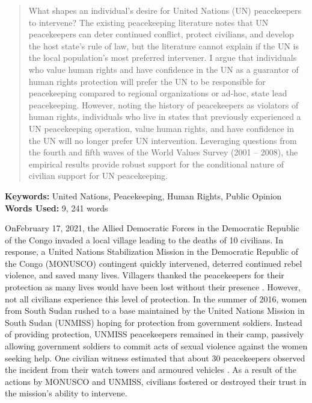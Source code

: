 \documentclass[12pt]{article}
\begin{document}
\begin{abstract}
\begin{singlespace}
What shapes an individual’s desire for United Nations (UN) peacekeepers to intervene? The existing peacekeeping literature notes that UN peacekeepers can deter continued conflict, protect civilians, and develop the host state’s rule of law, but the literature cannot explain if the UN is the local population's most preferred intervener. I argue that individuals who value human rights and have confidence in the UN as a guarantor of human rights protection will prefer the UN to be responsible for peacekeeping compared to regional organizations or ad-hoc, state lead peacekeeping. However, noting the history of peacekeepers as violators of human rights, individuals who live in states that previously experienced a UN peacekeeping operation, value human rights, and have confidence in the UN will no longer prefer UN intervention. Leveraging questions from the fourth and fifth waves of the World Values Survey (2001 – 2008), the empirical results provide robust support for the conditional nature of civilian support for UN peacekeeping.
\end{singlespace}
\end{abstract}
\begin{center}
\textbf{Keywords:} United Nations, Peacekeeping, Human Rights, Public Opinion \\
\textbf{Words Used:} 9, 241 words
\end{center}



\newpage

On\footnotemark[0] February 17, 2021, the Allied Democratic Forces in the Democratic Republic of the Congo invaded a local village leading to the deaths of 10 civilians. In response, a United Nations Stabilization Mission in the Democratic Republic of the Congo (MONUSCO) contingent quickly intervened, deterred continued rebel violence, and saved many lives. Villagers thanked the peacekeepers for their protection as many lives would have been lost without their presence \citep{BBC_2021}. However, not all civilians experience this level of protection. In the summer of 2016, women from South Sudan rushed to a base maintained by the United Nations Mission in South Sudan (UNMISS) hoping for protection from government soldiers. Instead of providing protection, UNMISS peacekeepers remained in their camp, passively allowing government soldiers to commit acts of sexual violence against the women seeking help. One civilian witness estimated that about 30 peacekeepers observed the incident from their watch towers and armoured vehicles \citep{patinkin_2016}. As a result of the actions by MONUSCO and UNMISS, civilians fostered or destroyed their trust in the mission's ability to intervene.
\end{document}
